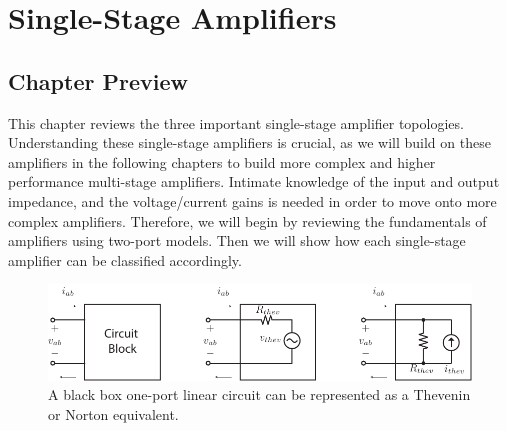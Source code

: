 \chapter{Single-Stage Amplifiers}
\label{ch:ch12_amps_single_stage}
\graphicspath{{./figures/figs_ch12_amps_single_stage/}}
\section{Chapter Preview}
This chapter reviews the three important single-stage amplifier topologies.  Understanding these single-stage amplifiers is crucial, as we will build on these amplifiers in the following chapters to build more complex and higher performance multi-stage amplifiers.  Intimate knowledge of the input and output impedance, and the voltage/current gains is needed in order to move onto more complex amplifiers.  Therefore, we will begin by reviewing the fundamentals of amplifiers using two-port models.  Then we will show how each single-stage amplifier can be classified accordingly.
\newpage
\begin{figure}[tb]
\centering
\includegraphics[scale=1]{oneports}
\caption{A black box one-port linear circuit can be represented as a Thevenin or Norton equivalent.}
\label{fig:oneports}
\end{figure}
